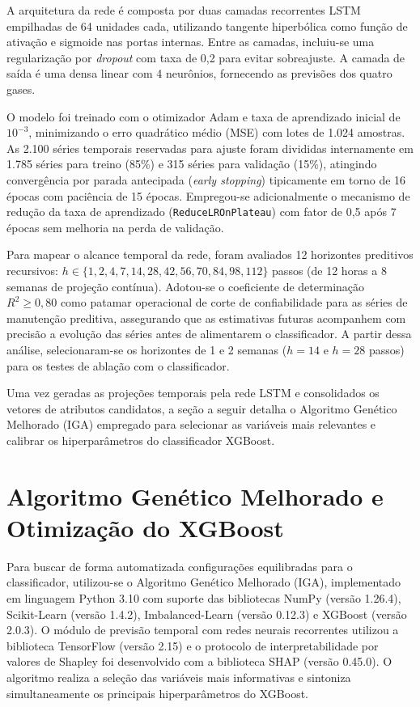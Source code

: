 A arquitetura da rede é composta por duas camadas recorrentes LSTM empilhadas de 64 unidades cada, utilizando tangente hiperbólica como função de ativação e sigmoide nas portas internas. Entre as camadas, incluiu-se uma regularização por \textit{dropout} com taxa de 0,2 para evitar sobreajuste. A camada de saída é uma densa linear com 4 neurônios, fornecendo as previsões dos quatro gases.

O modelo foi treinado com o otimizador Adam e taxa de aprendizado inicial de $10^{-3}$, minimizando o erro quadrático médio (MSE) com lotes de 1.024 amostras. As 2.100 séries temporais reservadas para ajuste foram divididas internamente em 1.785 séries para treino (85\%) e 315 séries para validação (15\%), atingindo convergência por parada antecipada (\textit{early stopping}) tipicamente em torno de 16 épocas com paciência de 15 épocas. Empregou-se adicionalmente o mecanismo de redução da taxa de aprendizado (\texttt{ReduceLROnPlateau}) com fator de 0,5 após 7 épocas sem melhoria na perda de validação.

Para mapear o alcance temporal da rede, foram avaliados 12 horizontes preditivos recursivos: $h \in \{1, 2, 4, 7, 14, 28, 42, 56, 70, 84, 98, 112\}$ passos (de 12 horas a 8 semanas de projeção contínua). Adotou-se o coeficiente de determinação $R^2 \ge 0,80$ como patamar operacional de corte de confiabilidade para as séries de manutenção preditiva, assegurando que as estimativas futuras acompanhem com precisão a evolução das séries antes de alimentarem o classificador. A partir dessa análise, selecionaram-se os horizontes de 1 e 2 semanas ($h = 14$ e $h = 28$ passos) para os testes de ablação com o classificador.

Uma vez geradas as projeções temporais pela rede LSTM e consolidados os vetores de atributos candidatos, a seção a seguir detalha o Algoritmo Genético Melhorado (IGA) empregado para selecionar as variáveis mais relevantes e calibrar os hiperparâmetros do classificador XGBoost.

\section{Algoritmo Genético Melhorado e Otimização do XGBoost}\label{sec:iga_xgboost}

Para buscar de forma automatizada configurações equilibradas para o classificador, utilizou-se o Algoritmo Genético Melhorado (IGA), implementado em linguagem Python 3.10 com suporte das bibliotecas NumPy (versão 1.26.4), Scikit-Learn (versão 1.4.2), Imbalanced-Learn (versão 0.12.3) e XGBoost (versão 2.0.3). O módulo de previsão temporal com redes neurais recorrentes utilizou a biblioteca TensorFlow (versão 2.15) e o protocolo de interpretabilidade por valores de Shapley foi desenvolvido com a biblioteca SHAP (versão 0.45.0). O algoritmo realiza a seleção das variáveis mais informativas e sintoniza simultaneamente os principais hiperparâmetros do XGBoost.


